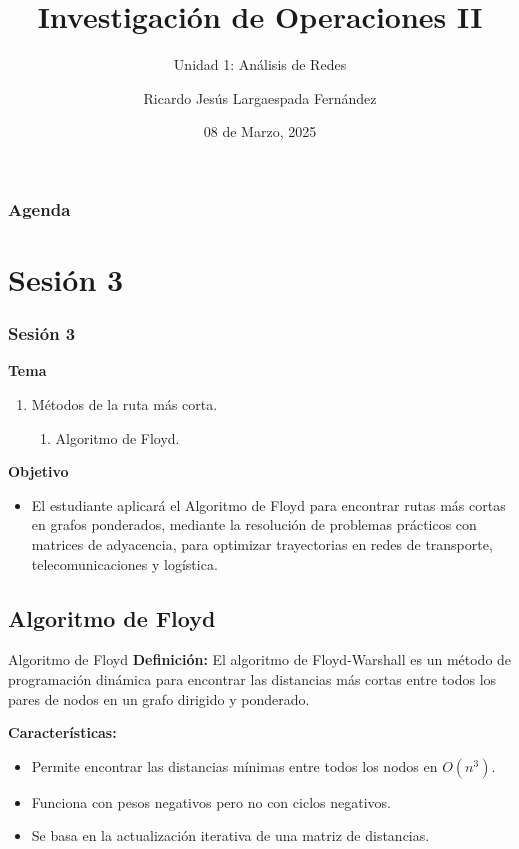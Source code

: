 \documentclass{beamer}
\title{Investigación de Operaciones II}
\subtitle{Unidad 1: Análisis de Redes}
\author{Ricardo Jesús Largaespada Fernández}
\institute{Ingeniería de Sistemas, DACTIC, UNI}
\date{08 de Marzo, 2025}
\begin{document}
\frame{\titlepage}

\begin{frame}
\frametitle{Agenda}
\tableofcontents
\end{frame}

\section{Sesión 3}
\begin{frame}
\frametitle{Sesión 3}

\textbf{Tema}
\begin{enumerate}
    \item Métodos de la ruta más corta.
    \begin{enumerate}
        \item Algoritmo de Floyd.
    \end{enumerate}
\end{enumerate}

\textbf{Objetivo}
\begin{itemize}
    \item El estudiante aplicará el Algoritmo de Floyd para encontrar rutas más cortas en grafos ponderados, mediante la resolución de problemas prácticos con matrices de adyacencia, para optimizar trayectorias en redes de transporte, telecomunicaciones y logística.
\end{itemize}

\end{frame}

\subsection{Algoritmo de Floyd}

\begin{frame}{Algoritmo de Floyd}
    \textbf{Definición:} El algoritmo de Floyd-Warshall es un método de programación dinámica para encontrar las distancias más cortas entre todos los pares de nodos en un grafo dirigido y ponderado.

    \textbf{Características:}
    \begin{itemize}
        \item Permite encontrar las distancias mínimas entre todos los nodos en $O(n^3)$.
        \item Funciona con pesos negativos pero no con ciclos negativos.
        \item Se basa en la actualización iterativa de una matriz de distancias.
    \end{itemize}
\end{frame}
\end{document}
